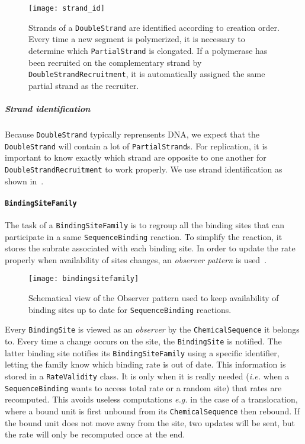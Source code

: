 \begin{figure}[!h]
  \centering
  \texttt{[image: strand\_id]}
  \caption{Strands of a \texttt{DoubleStrand} are identified according to creation order. Every time a new segment is polymerized, it is necessary to determine which \texttt{PartialStrand} is elongated. If a polymerase has been recruited on the complementary strand by \texttt{DoubleStrandRecruitment}, it is automatically assigned the same partial strand as the recruiter.}
  \label{fig:strand_id}
\end{figure}

\subparagraph{Strand identification} Because \texttt{DoubleStrand} typically reprensents DNA, we expect that the \texttt{DoubleStrand} will contain a lot of \texttt{PartialStrand}s. For replication, it is important to know exactly which strand are opposite to one another for \texttt{DoubleStrandRecruitment} to work properly. We use strand identification as shown in~.


\paragraph{\texttt{BindingSiteFamily}}

The task of a \texttt{BindingSiteFamily} is to regroup all the binding sites that can participate in a same \texttt{SequenceBinding} reaction. To simplify the reaction, it stores the subrate associated with each binding site. In order to update the rate properly when availability of sites changes, an \emph{observer pattern} is used~.

\begin{figure}[!h]
  \centering
  \texttt{[image: bindingsitefamily]}
  \caption{Schematical view of the Observer pattern used to keep availability of binding sites up to date for \texttt{SequenceBinding} reactions.}
  \label{fig:det_bsf}
\end{figure}

Every \texttt{BindingSite} is viewed as an \emph{observer} by the \texttt{ChemicalSequence} it belongs to. Every time a change occurs on the site, the \texttt{BindingSite} is notified. The latter binding site notifies its \texttt{BindingSiteFamily} using a specific identifier, letting the family know which binding rate is out of date. This information is stored in a \texttt{RateValidity} class. It is only when it is really needed (\textit{i.e.} when a \texttt{SequenceBinding} wants to access total rate or a random site) that rates are recomputed. This avoids useless computations \textit{e.g.} in the case of a translocation, where a bound unit is first unbound from its \texttt{ChemicalSequence} then rebound. If the bound unit does not move away from the site, two updates will be sent, but the rate will only be recomputed once at the end.
